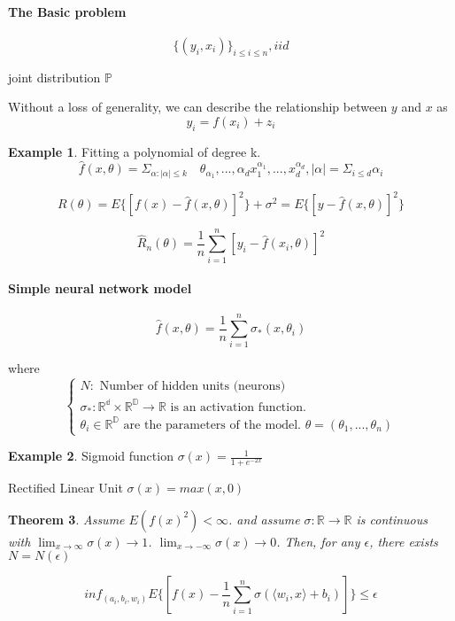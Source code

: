 \documentclass{article}
\newtheorem{theorem}{Theorem}
\theoremstyle{definition}
\newtheorem{example}[theorem]{Example}
\theoremstyle{remark}
\begin{document}
\paragraph{The Basic problem}

$$\{(y_i, x_i)\}_{i \leq i\leq n}, iid $$

joint distribution $\mathbb{P}$

Without a loss of generality, we can describe the relationship between $y$ and $x$ as $$y_i = f(x_i) + z_i$$

\begin{example}
    Fitting a polynomial of degree k. 
    $$\hat{f}(x, \theta) = \Sigma_{\alpha: |\alpha| \leq k}  \quad \theta_{\alpha_1}, ... , \alpha_d x_1^{\alpha_1}, ... , x_d^{\alpha_d}, |\alpha| = \Sigma_{i \leq d} \alpha_i$$

    $$R(\theta) = E\{[f(x)-\hat f(x, \theta)]^2\} + \sigma^2 = E\{[y - \hat f(x, \theta)]^2\}$$

    $$\hat R_n(\theta) = \frac{1}{n} \sum_{i=1}^{n}[y_i - \hat f(x_i, \theta)]^2$$
\end{example}

\paragraph{Simple neural network model}

$$\hat f(x, \theta) = \frac{1}{n}\sum_{i=1}^{n} \sigma_*(x, \theta_i)$$

where
$$
\begin{cases}
    N: \text{ Number of hidden units (neurons) }  \\
    \sigma_*: \mathbb{R^d} \times \mathbb{R^D} \to \mathbb{R} \text{ is an activation function. } \\
    \theta_i \in \mathbb{R^D} \text{ are the parameters of the model. } \theta = (\theta_1, ... , \theta_n)
\end{cases}
$$

\begin{example}
    Sigmoid function $\sigma(x) = \frac{1}{1 + e^{-2x}}$

    Rectified Linear Unit $\sigma(x) = max(x, 0)$
\end{example}

\begin{theorem}
    Assume $E(f(x)^2) < \infty$. and assume 
    $\sigma: \mathbb{R} \to \mathbb{R}$ is continuous with $\lim_{x \to \infty} \sigma(x) \to 1$. $\lim_{x \to -\infty}\sigma(x) \to 0$. Then, for any $\epsilon$, there exists $N = N(\epsilon)$

    $$inf_{(a_i, b_i, w_i)}E\{[f(x) - \frac{1}{n}\sum_{i=1}^{n}\sigma(\langle w_i, x \rangle + b_i)]\} \leq \epsilon$$
\end{theorem}
\end{document}
